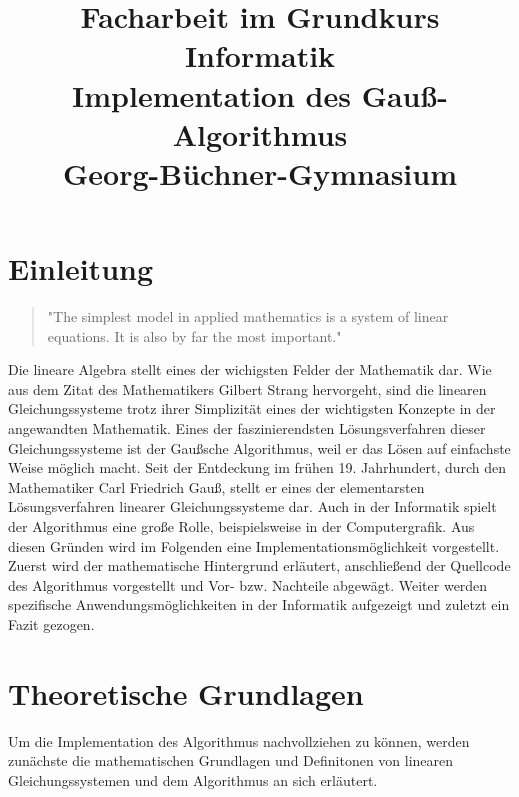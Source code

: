 \documentclass[a4paper, 12pt]{report}
\title{\LARGE Facharbeit im Grundkurs Informatik  \vspace*{0.5cm} \\
  \Huge Implementation des Gauß-Algorithmus \vspace*{0.5cm} \\
  \LARGE Georg-Büchner-Gymnasium}
\begin{document}
\maketitle
\tableofcontents

{\let\clearpage\relax \chapter{Einleitung}}
\begin{quote}
    "The simplest model in applied mathematics is a system of linear equations. It is also by far the most important."
\end{quote}

Die lineare Algebra stellt eines der wichigsten Felder der Mathematik dar. Wie aus dem Zitat des Mathematikers Gilbert Strang hervorgeht,
sind die linearen Gleichungssysteme trotz ihrer Simplizität eines der wichtigsten Konzepte in der angewandten Mathematik.
Eines der faszinierendsten Lösungsverfahren dieser Gleichungssysteme ist der Gaußsche Algorithmus,
weil er das Lösen auf einfachste Weise möglich macht. Seit der Entdeckung im frühen 19. Jahrhundert, durch den
Mathematiker Carl Friedrich Gauß, stellt er eines der elementarsten Lösungsverfahren linearer Gleichungssysteme dar.
Auch in der Informatik spielt der Algorithmus eine große Rolle, beispielsweise in der Computergrafik. Aus diesen Gründen wird im Folgenden eine Implementationsmöglichkeit
vorgestellt. Zuerst wird der mathematische Hintergrund erläutert, anschließend der Quellcode des Algorithmus vorgestellt und
Vor- bzw. Nachteile abgewägt.
Weiter werden spezifische Anwendungsmöglichkeiten in der Informatik aufgezeigt und zuletzt ein Fazit gezogen.

\chapter{Theoretische Grundlagen}
Um die Implementation des Algorithmus nachvollziehen zu können, werden zunächste die mathematischen Grundlagen und Definitonen
von linearen Gleichungssystemen und dem Algorithmus an sich erläutert.
\end{document}

